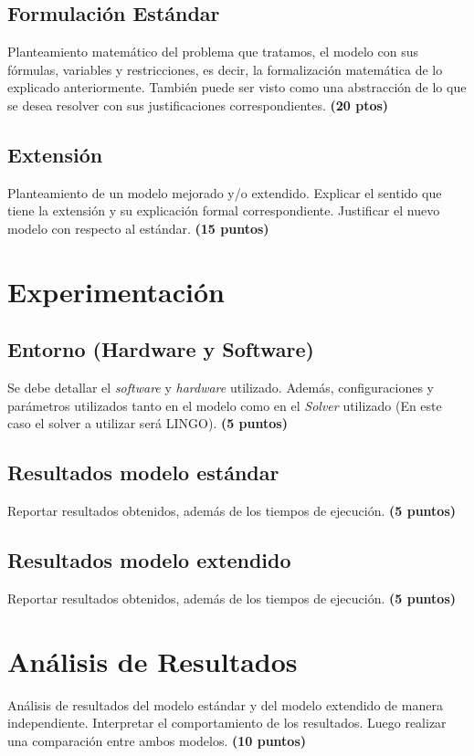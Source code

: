 \documentclass[journal, 10pt]{IEEEtran}
\begin{document}
\subsection{Formulación Estándar}
Planteamiento matemático del problema que tratamos, el modelo con sus fórmulas, variables y restricciones, es decir, la formalización matemática de lo explicado anteriormente. También puede ser visto como una abstracción de lo que se desea resolver con sus justificaciones correspondientes. \textbf{(20 ptos)}

\subsection{Extensión}
Planteamiento de un modelo mejorado y/o extendido. Explicar el sentido que tiene la extensión y su explicación formal correspondiente. Justificar el nuevo modelo con respecto al estándar. \textbf{(15 puntos)}

\section{Experimentación}
\subsection{Entorno (Hardware y Software)}
Se debe detallar el \textit{software} y \textit{hardware} utilizado. Además, configuraciones y parámetros utilizados tanto en el modelo como en el \textit{Solver} utilizado (En este caso el solver a utilizar será LINGO). \textbf{(5 puntos)}
\subsection{Resultados modelo estándar} 
Reportar resultados obtenidos, además de los tiempos de ejecución. \textbf{(5 puntos)}

\subsection{Resultados modelo extendido}
Reportar resultados obtenidos, además de los tiempos de ejecución. \textbf{(5 puntos)}

\section{Análisis de Resultados}
Análisis de resultados del modelo estándar y del modelo extendido de manera independiente. Interpretar el comportamiento de los resultados. Luego realizar una comparación entre ambos modelos. \textbf{(10 puntos)}
\end{document}
